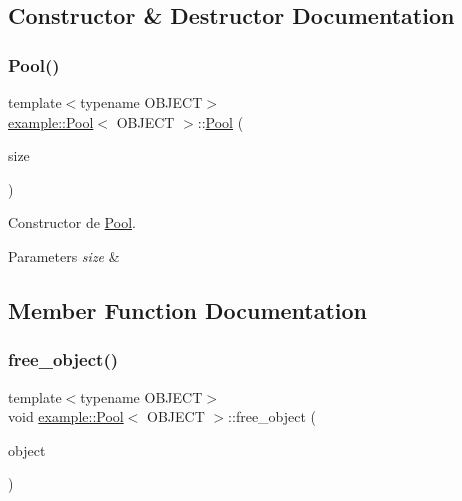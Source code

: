 \subsection{Constructor \& Destructor Documentation}
\mbox{\label{classexample_1_1_pool_a89e3934cca6a84b88826c9ab43835162}} 
\subsubsection{\texorpdfstring{Pool()}{Pool()}}
{\footnotesize\ttfamily template$<$typename O\+B\+J\+E\+CT$>$ \\
\mbox{\hyperlink{classexample_1_1_pool}{example\+::\+Pool}}$<$ O\+B\+J\+E\+CT $>$\+::\mbox{\hyperlink{classexample_1_1_pool}{Pool}} (\begin{DoxyParamCaption}\item[{size\+\_\+t}]{size }\end{DoxyParamCaption})\hspace{0.3cm}{\ttfamily [inline]}}



Constructor de \mbox{\hyperlink{classexample_1_1_pool}{Pool}}. 


\begin{DoxyParams}{Parameters}
{\em size} & \\
\hline
\end{DoxyParams}


\subsection{Member Function Documentation}
\mbox{\label{classexample_1_1_pool_a4bfcdfeaf2685168c0a8ffc471fb0578}} 
\subsubsection{\texorpdfstring{free\_object()}{free\_object()}}
{\footnotesize\ttfamily template$<$typename O\+B\+J\+E\+CT$>$ \\
void \mbox{\hyperlink{classexample_1_1_pool}{example\+::\+Pool}}$<$ O\+B\+J\+E\+CT $>$\+::free\+\_\+object (\begin{DoxyParamCaption}\item[{Object $\ast$}]{object }\end{DoxyParamCaption})\hspace{0.3cm}{\ttfamily [inline]}}



